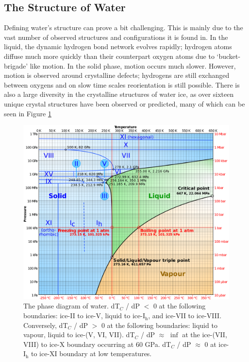 \subsection{The Structure of Water}
%
%
Defining water's structure can prove a bit challenging. This is mainly
due to the vast number of observed structures and configurations it is
found in. In the liquid, the dynamic hydrogen bond network evolves
rapidly; hydrogen atoms diffuse much more quickly than their
counterpart oxygen atoms due to `bucket-brigade' like motion. In the
solid phase, motion occurs much slower. However, motion is observed
around crystalline defects; hydrogens are still exchanged between
oxygens and on slow time scales reorientation is still possible. There
is also a large diversity in the crystalline structures of water ice,
as over sixteen unique crystal structures have been observed or
predicted\cite{Chaplin2018}, many of which can be seen in Figure
\ref{fig:phaseDiagram}

\begin{figure}
\includegraphics[width=\linewidth]{Figures/PhaseDiagram}
\caption{\label{fig:phaseDiagram} The phase diagram of
  water.\cite{Zhang2015} dT$_{C}$ / dP $<$ 0 at the following boundaries:
  ice-II to ice-V, liquid to ice-I$_\mathrm{h}$, and ice-VII to
  ice-VIII. Conversely, dT$_{C}$ / dP $>$ 0 at the following boundaries:
  liquid to vapour, liquid to ice-(V, VI, VII). dT$_{C}$ / dP $\approx$
  $\inf$ at the ice-(VII, VIII) to ice-X boundary occurring at 60 GPa.
  dT$_{C}$ / dP $\approx$ 0 at ice-I$_\mathrm{h}$ to ice-XI boundary at
  low temperatures. }
\end{figure}


